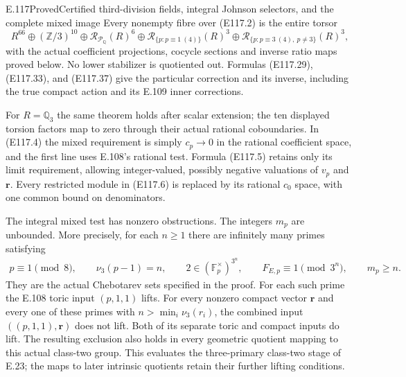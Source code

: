 \begin{statement}{E.117}{Proved}{Certified third-division fields, integral Johnson selectors, and the complete mixed image}
Every nonempty fibre over (E117.2) is the entire torsor
\[
 R^{66}\oplus(\mathbb Z/3)^{10}\oplus\mathcal R_{\mathcal P_{\mathbb Q}}(R)^6
 \oplus\mathcal R_{\{p:p\equiv1\ (4)\}}(R)^3
 \oplus\mathcal R_{\{p:p\equiv3\ (4),\ p\ne3\}}(R)^3,
 \tag{E117.6}
\]
with the actual coefficient projections, cocycle sections and
inverse ratio maps proved below.  No lower stabilizer is quotiented
out.  Formulas (E117.29), (E117.33), and (E117.37) give the
particular correction and its inverse, including the true
compact action and its E.109 inner corrections.

For $R=\mathbb Q_3$ the same theorem holds after scalar
extension; the ten displayed torsion factors map to zero through
their actual rational coboundaries.  In (E117.4) the mixed requirement is simply
$c_p\to0$ in the rational coefficient space, and the first
line uses E.108's rational test.
Formula (E117.5) retains only its limit requirement, allowing
integer-valued, possibly negative valuations of $v_p$ and
$\mathbf r$.
Every restricted module in (E117.6) is replaced by its rational
$c_0$ space, with one common bound on denominators.

The integral mixed test has nonzero obstructions.  The integers
$m_p$ are unbounded.  More precisely, for each $n\ge1$ there
are infinitely many primes satisfying
\[
 \begin{gathered}
 p\equiv1\pmod8,\qquad \nu_3(p-1)=n,\qquad
 2\in(\mathbb F_p^{\times})^{3^n},\qquad
 F_{E,p}\equiv1\pmod{3^n},\qquad m_p\ge n.
 \end{gathered}
 \tag{E117.7}
\]
They are the actual Chebotarev sets specified in the proof.
For each such prime the E.108 toric input $(p,1,1)$ lifts.
For every nonzero compact vector $\mathbf r$ and every one
of these primes with $n>\min_i\nu_3(r_i)$, the combined input
$((p,1,1),\mathbf r)$ does not lift.
Both of its separate toric and compact inputs do lift.
The resulting exclusion also holds in every geometric quotient
mapping to this actual class-two group.
This evaluates the three-primary class-two stage of E.23;
the maps to later intrinsic quotients retain their further
lifting conditions.
\end{statement}
